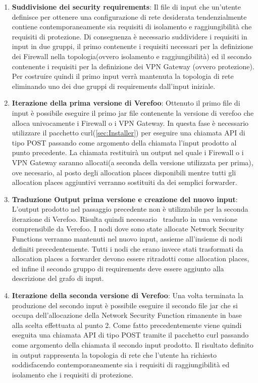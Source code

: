 \begin{enumerate}
    \item \textbf{Suddivisione dei security requirements}: Il file di input che un'utente definisce per ottenere una configurazione di rete desiderata tendenzialmente contiene
        contemporaneamente sia requisiti di isolamento e raggiungibilità che requisiti di protezione. Di conseguenza è necessario suddividere i requisiti in input in due gruppi, 
        il primo contenente i requisiti necessari per la definizione dei Firewall nella topologia(ovvero isolamento e raggiungibilità) ed il secondo contenente i requisiti per la 
        definizione dei VPN Gateway (ovvero protezione). Per costruire quindi il primo input verrà mantenuta la topologia di rete eliminando uno 
        dei due gruppi di requirements dall'input iniziale.
    \item \textbf{Iterazione della prima versione di Verefoo}: Ottenuto il primo file di input è possibile eseguire il primo jar file contenente la versione di verefoo che alloca univocamente 
        i Firewall o i VPN Gateway. In questa fase è necessario utilizzare il pacchetto curl(\ref{sec:Installer}) per eseguire una chiamata API di tipo POST passando come argomento della chiamata l'input 
        prodotto al punto precedente. La chiamata restituirà un output nel quale i Firewall o i VPN Gateway saranno allocati(a seconda della versione utilizzata per prima), ove necesario, al posto degli allocation places disponibili mentre tutti gli allocation
        places aggiuntivi verranno sostituiti da dei semplici forwarder. 
    \item \textbf{Traduzione Output prima versione e creazione del nuovo input}: L'output prodotto nel passaggio precedente non è utilizzabile per la seconda iterazione di Verefoo. Risulta quindi necessario
    \   tradurlo in una versione comprensibile da Verefoo. I nodi dove sono state allocate Network Security Functions verranno mantenuti nel nuovo input, assieme all'insieme di nodi definiti precedentemente. Tutti i nodi
        che erano invece stati trasformati da allocation places a forwarder devono essere ritradotti come allocation places, ed infine il secondo gruppo di requirements deve essere aggiunto alla descrizione del grafo di input.
    \item \textbf{Iterazione della seconda versione di Verefoo}: Una volta terminata la produzione del secondo input è possibile eseguire il secondo file jar che si occupa dell'allocazione della Network
        Security Function rimanente in base alla scelta effettuata al punto 2. Come fatto precedentemente viene quindi eseguita una chiamata API di tipo POST tramite il pacchetto curl passando come argomento della chiamata
        il secondo input prodotto. Il risultato definito in output rappresenta la topologia di rete che l'utente ha richiesto soddisfacendo contemporaneamente sia i requisiti di raggiungibilità ed isolamento che i requisiti di protezione.
\end{enumerate}

